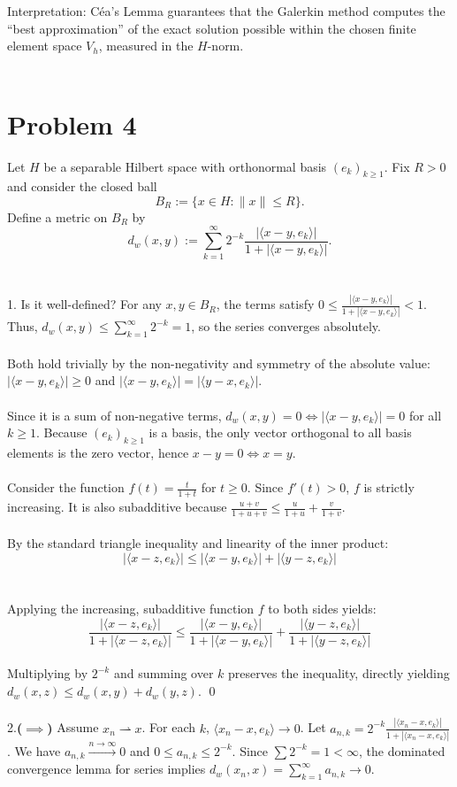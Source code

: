 \documentclass{article}
\begin{document}
Interpretation: 
Céa's Lemma guarantees that the Galerkin method computes the ``best approximation'' of the exact solution possible within the chosen finite element space $V_h$, measured in the $H$-norm.
\\
\\
\section{Problem 4}
Let $H$ be a separable Hilbert space with orthonormal basis $(e_k)_{k \ge 1}$. Fix $R > 0$ and consider the closed ball
$$B_R := \{x \in H : \|x\| \le R\}.$$
Define a metric on $B_R$ by
$$d_w(x,y) := \sum_{k=1}^{\infty} 2^{-k} \frac{|\langle x-y, e_k \rangle|}{1 + |\langle x-y, e_k \rangle|}.$$
\\
\\
1. Is it well-defined? For any $x, y \in B_R$, the terms satisfy $0 \le \frac{|\langle x-y, e_k \rangle|}{1 + |\langle x-y, e_k \rangle|} < 1$. Thus, $d_w(x,y) \le \sum_{k=1}^{\infty} 2^{-k} = 1$, so the series converges absolutely.
\\
\\
 Both hold trivially by the non-negativity and symmetry of the absolute value: $|\langle x-y, e_k \rangle| \ge 0$ and $|\langle x-y, e_k \rangle| = |\langle y-x, e_k \rangle|$. \\
 \\
 Since it is a sum of non-negative terms, $d_w(x,y) = 0 \iff |\langle x-y, e_k \rangle| = 0$ for all $k \ge 1$. Because $(e_k)_{k \ge 1}$ is a basis, the only vector orthogonal to all basis elements is the zero vector, hence $x-y = 0 \iff x = y$.
\\
\\
Consider the function $f(t) = \frac{t}{1+t}$ for $t \ge 0$. Since $f'(t) > 0$, $f$ is strictly increasing. It is also subadditive because $\frac{u+v}{1+u+v} \le \frac{u}{1+u} + \frac{v}{1+v}$. 
 \\
 \\
By the standard triangle inequality and linearity of the inner product:
 $$|\langle x-z, e_k \rangle| \le |\langle x-y, e_k \rangle| + |\langle y-z, e_k \rangle|$$
\\
\\
Applying the increasing, subadditive function $f$ to both sides yields:
$$\frac{|\langle x-z, e_k \rangle|}{1 + |\langle x-z, e_k \rangle|} \le \frac{|\langle x-y, e_k \rangle|}{1 + |\langle x-y, e_k \rangle|} + \frac{|\langle y-z, e_k \rangle|}{1 + |\langle y-z, e_k \rangle|}$$
\\
Multiplying by $2^{-k}$ and summing over $k$ preserves the inequality, directly yielding $d_w(x,z) \le d_w(x,y) + d_w(y,z)$. \qed
\\
\\
2.\textbf{($\implies$)} Assume $x_n \rightharpoonup x$. For each $k$, $\langle x_n - x, e_k \rangle \to 0$. Let $a_{n,k} = 2^{-k} \frac{|\langle x_n - x, e_k \rangle|}{1 + |\langle x_n - x, e_k \rangle|}$. We have $a_{n,k} \xrightarrow{n \to \infty} 0$ and $0 \le a_{n,k} \le 2^{-k}$. Since $\sum 2^{-k} = 1 < \infty$, the dominated convergence lemma for series implies $d_w(x_n, x) = \sum_{k=1}^\infty a_{n,k} \to 0$.
\end{document}
